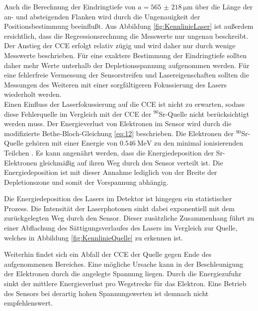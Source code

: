 Auch die Berechnung der Eindringtiefe von $a= \SI{565(218)}{\micro\metre}$ über die Länge der an- und absteigenden Flanken wird durch die Ungenauigkeit der Positionsbestimmung beeinflußt.
Aus Abbildung \ref{fig:KennlinieLaser} ist außerdem ersichtlich, dass die Regressionsrechnung die Messwerte nur ungenau beschreibt. Der Anstieg der CCE erfolgt relativ zügig und wird daher nur durch wenige Messwerte beschrieben. Für eine exaktere Bestimmung der Eindringtiefe sollten daher mehr Werte unterhalb der Depletionsspannung aufgenommen werden.
Für eine fehlerfreie Vermessung der Sensorstreifen und Lasereigenschaften sollten die Messungen des Weiteren mit einer sorgfältigeren Fokussierung des Lasers wiederholt werden.\\

Einen Einfluss der Laserfokussierung auf die CCE ist nicht zu erwarten, sodass diese Fehlerquelle im Vergleich mit der CCE der $^{90}$Sr-Quelle nicht berücksichtigt werden muss.
Der Energieverlust von Elektronen im Sensor wird durch die modifizierte Bethe-Bloch-Gleichung \ref{eq:12} beschrieben. Die Elektronen der $^{90}$Sr-Quelle gehören mit einer Energie von $\SI{0.546}{\mega\electronvolt}$ zu den minimal ionisierenden Teilchen \cite{periodensystem}. Es kann angenährt werden, dass die Energiedeposition der Sr-Elektronen gleichmäßig auf ihren Weg durch den Sensor verteilt ist. Die Energiedeposition ist mit dieser Annahme lediglich von der Breite der Depletionszone und somit der Vorspannung abhängig.

Die Energiedeposition des Lasers im Detektor ist hingegen ein statistischer Prozess. Die Intensität der Laserphotonen sinkt dabei exponentiell mit dem zurückgelegten Weg durch den Sensor. Dieser zusätzliche Zusammenhang führt zu einer Abflachung des Sättigungsverlaufes des Lasers im Vergleich zur Quelle, welches in Abbildung \ref{fig:KennlinieQuelle} zu erkennen ist.

Weiterhin findet sich ein Abfall der CCE der Quelle gegen Ende des aufgenommenen Bereiches. Eine mögliche Ursache kann in der Beschleunigung der Elektronen durch die angelegte Spannung liegen. Durch die Energiezufuhr sinkt der mittlere Energieverlust pro Wegstrecke für das Elektron. Eine Betrieb des Sensors bei derartig hohen Spannungswerten ist demnach nicht empfehlenswert.\\

